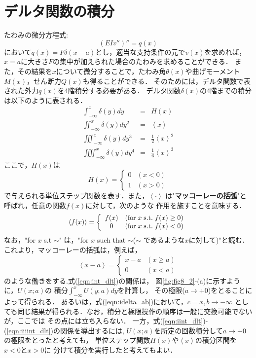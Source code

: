 \documentclass[10pt,a4j]{jbook}
\begin{document}
\section{デルタ関数の積分}
たわみの微分方程式:
\begin{equation}
	\left(EIv''\right)''=q(x)
\end{equation}
において$q(x)=F\delta(x-a)$とし，適当な支持条件の元で$v(x)$を求めれば，
$x=a$に大きさ$F$の集中が加えられた場合のたわみを求めることができる．
また，その結果を$x$について微分することで，たわみ角$\theta(x)$や曲げモーメント
$M(x)$，せん断力$Q(x)$も得ることができる．
そのためには，デルタ関数で表された外力$q(x)$を4階積分する必要がある．
デルタ関数$\delta(x)$の4階までの積分は以下のように表される．
\begin{eqnarray}
	\int_{-\infty}^x \delta(y)dy &=& H(x) 
	\label{eqn:int_dlt}
	\\ 
	\iint_{-\infty}^x \delta(y)dy^2 &=& \left< x\right> 
	\label{eqn:iint_dlt}
	\\ 
	\iiint_{-\infty}^x \delta(y)dy^3 &=& \frac{1}{2}\left<x\right>^2
	\label{eqn:iiint_dlt}
	\\ 
	\iiiint_{-\infty}^x \delta(y)dy^4 &=& \frac{1}{6}\left<x\right>^3
	\label{eqn:iiiint_dlt}
\end{eqnarray}
ここで，$H(x)$は
\begin{equation}
	H(x)=\left\{
	\begin{array}{cc}
		0 & (x<0) \\
		1 & (x>0)
	\end{array}
	\right.
\end{equation}
で与えられる単位ステップ関数を表す．また，$\left< \cdot \right>$
は"{\bf マッコーレーの括弧}"と呼ばれ，任意の関数$f(x)$に対して，次のような
作用を施すことを意味する．
\begin{equation}
	\left< f(x) \right>=
	\left\{
	\begin{array}{cc}
		f(x) & ({\rm for\;} x\; {\rm s.t.} \; f(x) \ge 0) \\
		0 & ({\rm for}\; x \; {\rm s.t.} \;  f(x) < 0)
	\end{array}
	\right.
\end{equation}
なお，"for $x$ s.t $\sim$" は，"for $x$ such that $\sim $($\sim$ であるような$x$に対して)"と読む．
これより，マッコーレーの括弧は，例えば，
\begin{equation}
	\left< x-a \right>=
	\left\{
	\begin{array}{cc}
		x-a & (x \ge a) \\
		0 & (x <a)
	\end{array}
	\right.
\end{equation}
のような働きをする.式(\ref{eqn:int_dlt})の関係は，
図\ref{fig:fig8_2}-(a)に示すように，$U(x;a)$の
積分$\int_{-\infty}^x U(y;a)dy$を計算し，
その極限($a\rightarrow +0$)をとることによって得られる．
あるいは，式(\ref{eqn:idelta_ab})において，$c=x,b\rightarrow -\infty$
としても同じ結果が得られる．なお，積分と極限操作の順序は一般に交換可能でないが，ここでは
その点には立ち入らない．
一方，式(\ref{eqn:iint_dlt})-(\ref{eqn:iiiint_dlt})の関係を導出するには,
$U(x;a)$を所定の回数積分して$a\rightarrow +0$の極限をとったと考えても，
単位ステップ関数$H(x)$や$\left< x \right>$の積分区間を$x<0$と$x>0$に
分けて積分を実行したと考えてもよい．
\end{document}
